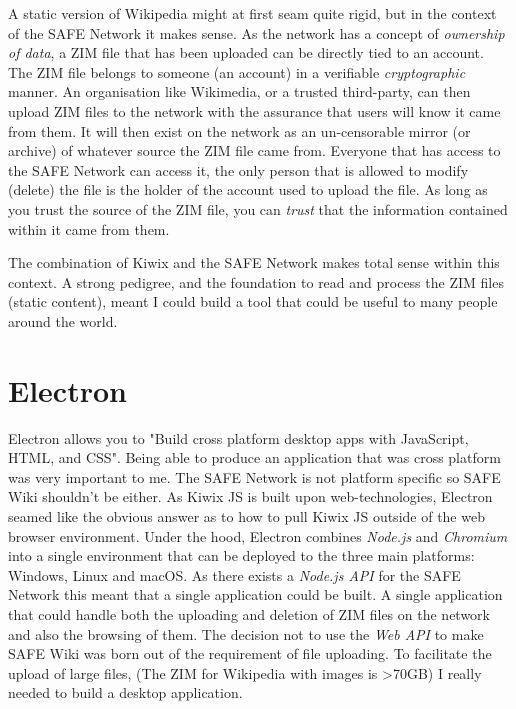 A static version of Wikipedia might at first seam quite rigid, but in the context of the SAFE Network it makes sense. As the network has a concept of \textit{ownership of data}, a ZIM file that has been uploaded can be directly tied to an account. The ZIM file belongs to someone (an account) in a verifiable \textit{cryptographic} manner. An organisation like Wikimedia, or a trusted third-party, can then upload ZIM files to the network with the assurance that users will know it came from them. It will then exist on the network as an un-censorable mirror (or archive) of whatever source the ZIM file came from. Everyone that has access to the SAFE Network can access it, the only person that is allowed to modify (delete) the file is the holder of the account used to upload the file. As long as you trust the source of the ZIM file, you can \textit{trust} that the information contained within it came from them.

The combination of Kiwix and the SAFE Network makes total sense within this context. A strong pedigree, and the foundation to read and process the ZIM files (static content), meant I could build a tool that could be useful to many people around the world.

\section{Electron}

Electron allows you to "Build cross platform desktop apps with JavaScript, HTML, and CSS". Being able to produce an application that was cross platform was very important to me. The SAFE Network is not platform specific so SAFE Wiki shouldn't be either. As Kiwix JS is built upon web-technologies, Electron seamed like the obvious answer as to how to pull Kiwix JS outside of the web browser environment. Under the hood, Electron combines \textit{Node.js} and \textit{Chromium} into a single environment that can be deployed to the three main platforms: Windows, Linux and macOS. As there exists a \textit{Node.js API} for the SAFE Network this meant that a single application could be built. A single application that could handle both the uploading and deletion of ZIM files on the network and also the browsing of them. The decision not to use the \textit{Web API} to make SAFE Wiki was born out of the requirement of file uploading. To facilitate the upload of large files, (The ZIM for Wikipedia with images is \textgreater 70GB) I really needed to build a desktop application.

